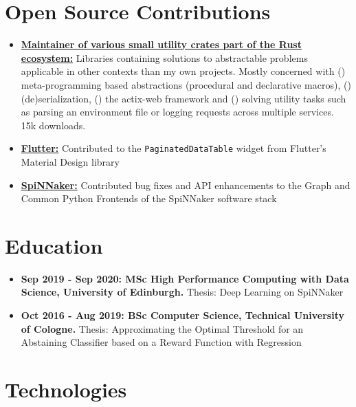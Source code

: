 \documentclass[10pt]{article}
\begin{document}
\section*{Open Source Contributions}

\begin{itemize}[label={}, leftmargin=*]

\item \href{https://crates.io/users/jofas}{\textbf{Maintainer of various
  small utility crates part of the Rust ecosystem:}} Libraries
containing solutions to abstractable problems applicable in other
contexts than my own projects. Mostly concerned with ()
meta-programming based abstractions (procedural and declarative
macros), () (de)serialization, ()
the actix-web framework and () solving utility tasks
such as parsing an environment file or logging requests across
multiple services. 15k downloads.

\item \href{https://github.com/flutter/flutter}{\textbf{Flutter:}}
Contributed to the \texttt{PaginatedDataTable} widget from Flutter's
Material Design library

\item \href{https://github.com/SpiNNakerManchester}{\textbf{SpiNNaker:}}
Contributed bug fixes and API enhancements to the Graph and Common
Python Frontends of the SpiNNaker software stack

\end{itemize}

\section*{Education}

\begin{itemize}[label={}, leftmargin=*]

\item \textbf{Sep 2019 - Sep 2020: MSc High Performance Computing with Data
  Science, University of Edinburgh.} Thesis: Deep Learning on SpiNNaker

\item \textbf{Oct 2016 - Aug 2019: BSc Computer Science, Technical
  University of Cologne.} Thesis: Approximating the Optimal Threshold
  for an Abstaining Classifier based on a Reward Function with Regression

\end{itemize}

\section*{Technologies}
\end{document}

